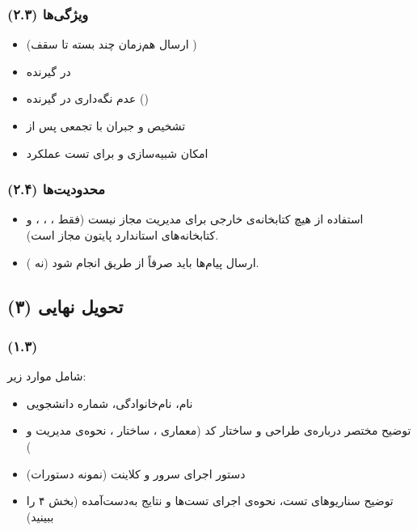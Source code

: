 \subsubsection*{(۲.۳) ویژگی‌ها}
\begin{itemize}
  \item {} (ارسال هم‌زمان چند بسته تا سقف )
  \item {} در گیرنده
  \item عدم نگه‌داری  در گیرنده ()
  \item تشخیص و جبران  با  تجمعی پس از 
  \item امکان شبیه‌سازی  و  برای تست عملکرد
\end{itemize}

\subsubsection*{(۲.۴) محدودیت‌ها}
\begin{itemize}
  \item استفاده از هیچ کتابخانه‌ی خارجی برای مدیریت  مجاز نیست (فقط ، ، ،  و کتابخانه‌های  استاندارد پایتون مجاز است).
  \item ارسال پیام‌ها باید صرفاً از طریق  انجام شود (نه ).
\end{itemize}

\subsection*{(۳) تحویل نهایی}

\subsubsection*{(۱.۳) }
شامل موارد زیر:
\begin{itemize}
  \item نام، نام‌خانوادگی، شماره دانشجویی
  \item توضیح مختصر درباره‌ی طراحی و ساختار کد (معماری ، ساختار ، نحوه‌ی مدیریت  و )
  \item دستور اجرای سرور و کلاینت (نمونه دستورات)
  \item توضیح سناریوهای تست، نحوه‌ی اجرای تست‌ها و نتایج به‌دست‌آمده (بخش ۴ را ببینید)
\end{itemize}

